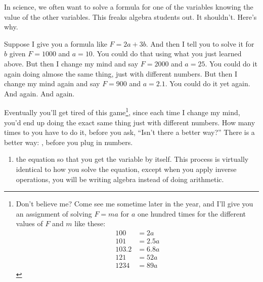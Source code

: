 \documentclass[fleqn,letterpaper,12pt,printwatermark=false]{memoir}
\begin{document}
\begin{myLesson}[][]
    In science,
    we often want to solve a formula for one of the variables
     knowing the value of the other variables.
    This freaks algebra students out. 
    It shouldn't. 
    Here's why.

    Suppose I give you a formula like $F = 2a + 3b$.
    And then I tell you to solve it for $b$ given $F=1000$ and $a=10$.
    You could do that using what you just learned above.
    But then I change my mind and say $F=2000$ and $a=25$.
    You could do it again doing almose the same thing, just with different numbers.
    But then I change my mind again and say $F=900$ and $a=2.1$.
    You could do it yet again. And again. And again.
    
    Eventually you'll get tired of this game\footnote{
        Don't believe me? Come see me sometime later in the year, and I'll give you 
        an assignment of solving $F = ma$ for $a$ one hundred times for the different values of $F$ and $m$ like these:
        \begin{align*}
            100 &= 2a\\
            101 &= 2.5a\\
            103.2 &= 6.8a\\
            121 &= 52a\\
            1234 &= 89a
        \end{align*}
    },
    since each time I change my mind, you'd end up doing the exact same thing 
    just with different numbers.
    How many times to you have to do it, before you ask, ``Isn't there a better way?''
    There is a better way: , before you plug in numbers.
\end{myLesson}

\begin{myKeyConcepts}
    \begin{enumerate}
        \item {} the equation so that you get the variable by itself.
        This process is virtually identical to how you solve the equation,
        except when you apply inverse operations, you will be writing algebra instead of doing arithmetic.
    \end{enumerate}
\end{myKeyConcepts}
\end{document}
